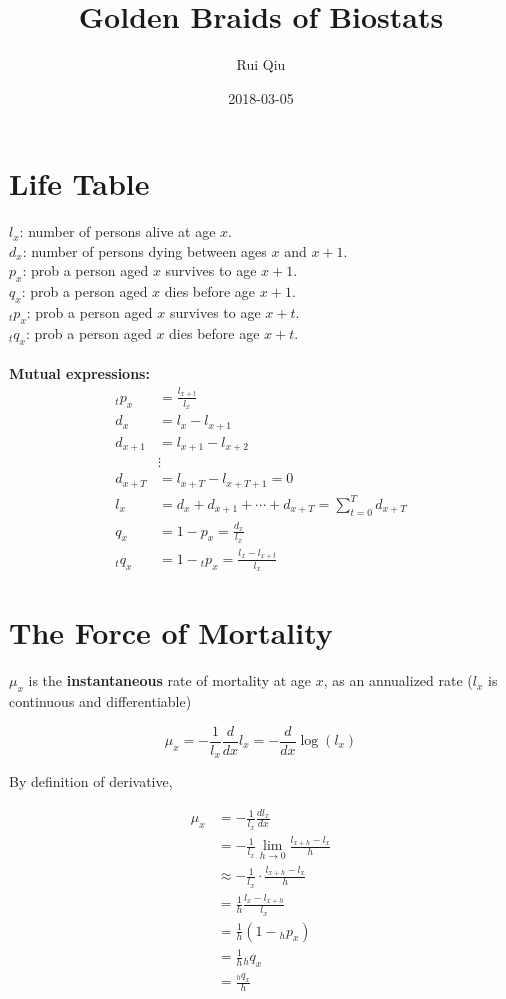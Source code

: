 \documentclass[a4paper, 11pt, twoside]{article}
\begin{document}
\title{Golden Braids of Biostats}
\author{Rui Qiu}
\date{2018-03-05}

\maketitle

\section{Life Table}
$l_x$: number of persons alive at age $x$.\\
$d_x$: number of persons dying between ages $x$ and $x+1$.\\
$p_x$: prob a person aged $x$ survives to age $x+1$.\\
$q_x$: prob a person aged $x$ dies before age $x+1$.\\
${}_tp_x$: prob a person aged $x$ survives to age $x+t$.\\
${}_tq_x$: prob a person aged $x$ dies before age $x+t$.\\
\\\textbf{Mutual expressions:}
\[\begin{split}
	{}_tp_x&=\frac{l_{x+t}}{l_x}\\
	d_x &= l_x-l_{x+1}\\
	d_{x+1} &=l_{x+1}-l_{x+2}\\
	&\vdots\\
	d_{x+T}&=l_{x+T}-l_{x+T+1}=0\\
	l_x&=d_x+d_{x+1}+\cdots +d_{x+T}=\sum^T_{t=0}d_{x+T}\\
	q_x&=1-p_x=\frac{d_x}{l_x}\\
	{}_tq_x&=1-{}_tp_x=\frac{l_x-l_{x+t}}{l_x}
\end{split}\]

\section{The Force of Mortality}
$\mu_x$ is the \textbf{instantaneous} rate of mortality at age $x$, as an annualized rate ($l_x$ is continuous and differentiable)

\[\mu_x=-\frac1{l_x}\frac{d}{dx}l_x=-\frac{d}{dx}\log(l_x)\]

By definition of derivative,

\[\begin{split}
\mu_x &= -\frac1{l_x}\frac{dl_x}{dx}\\
&=-\frac1{l_x}\lim_{h\to 0}\frac{l_{x+h}-l_x}{h}\\
&\approx -\frac1{l_x}\cdot\frac{l_{x+h}-l_x}{h}\\
&=\frac{1}{h}\frac{l_x-l_{x+h}}{l_x}\\
&=\frac1h(1-{}_hp_x)\\
&=\frac1h{}_hq_x\\
&=\frac{{}_hq_x}{h}	
\end{split}
\]
\end{document}
